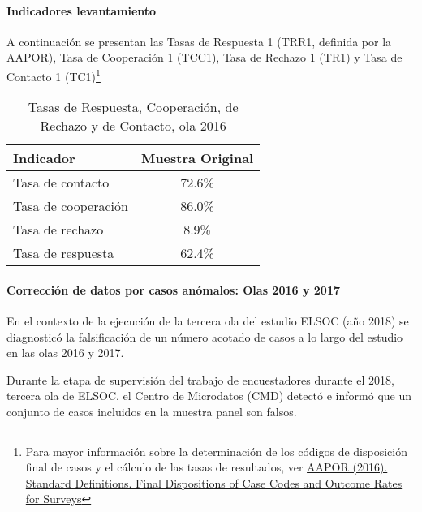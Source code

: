\documentclass[
  12pt,
]{article}
\begin{document}
\hypertarget{indicadores-levantamiento}{%
\paragraph*{Indicadores levantamiento}\label{indicadores-levantamiento}}

A continuación se presentan las Tasas de Respuesta 1 (TRR1, definida por la AAPOR), Tasa de Cooperación 1 (TCC1), Tasa de Rechazo 1 (TR1) y Tasa de Contacto 1 (TC1)\footnote{Para mayor información sobre la determinación de los códigos de disposición final de casos y el cálculo de las tasas de resultados, ver
  \href{http://www.aapor.org/AAPOR_Main/media/publications/Standard-Definitions20169theditionfinal.pdf}{AAPOR (2016). Standard Definitions. Final Dispositions of Case Codes and Outcome Rates for Surveys}}

\begin{table}[H]

\caption{\label{tab:tabla-tasas-ola1}Tasas de Respuesta, Cooperación, de Rechazo y de Contacto, ola 2016}
\centering
\begin{tabular}[t]{lc}
\toprule
Indicador & Muestra Original\\
\midrule
Tasa de contacto & 72.6\%\\
Tasa de cooperación & 86.0\%\\
Tasa de rechazo & 8.9\%\\
Tasa de respuesta & 62.4\%\\
\bottomrule
\end{tabular}
\end{table}

\hypertarget{casos-falsificados}{%
\paragraph*{Corrección de datos por casos anómalos: Olas 2016 y 2017}\label{casos-falsificados}}

En el contexto de la ejecución de la tercera ola del estudio ELSOC (año 2018) se diagnosticó la falsificación de un número acotado de casos a lo largo del estudio en las olas 2016 y 2017.

Durante la etapa de supervisión del trabajo de encuestadores durante el 2018, tercera ola de ELSOC, el Centro de Microdatos (CMD) detectó e informó que un conjunto de casos incluidos en la muestra panel son falsos.
\end{document}
